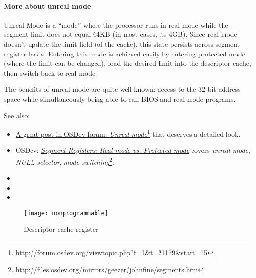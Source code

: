 \paragraph{More about unreal mode}

Unreal Mode is a ``mode'' where the processor runs in real mode while the segment limit
does not equal 64KB (in most cases, its 4GB). Since real mode doesn't update the limit
field (of the cache), this state persists across segment register loads. Entering this
mode is achieved easily by entering protected mode (where the limit can be changed), load
the desired limit into the descriptor cache, then switch back to real
mode. 

The benefits of unreal mode are quite well known: access to the 32-bit address space while
simultaneously being able to call BIOS and real mode programs. 

See also:
\begin{itemize}
\item \href{http://forum.osdev.org/viewtopic.php?f=1\&t=21179\&start=15}{A great post in OSDev forum: \emph{Unreal
  mode}}\footnote{\url{http://forum.osdev.org/viewtopic.php?f=1&t=21179&start=15}} that
deserves a detailed look.
\item OSDev:
  \href{http://files.osdev.org/mirrors/geezer/johnfine/segments.htm}{\emph{Segment
      Registers: Real mode vs. Protected mode}} covers \emph{unreal mode}, \emph{NULL
    selector}, \emph{mode
    switching}\footnote{\url{http://files.osdev.org/mirrors/geezer/johnfine/segments.htm}}.
\item {}
\item {}
\item {}
\end{itemize}

\begin{figure}[h]
  \centering
  \texttt{[image: nonprogrammable]}
  \caption{Descriptor cache register}
  \label{fig:cache-register}
\end{figure}

